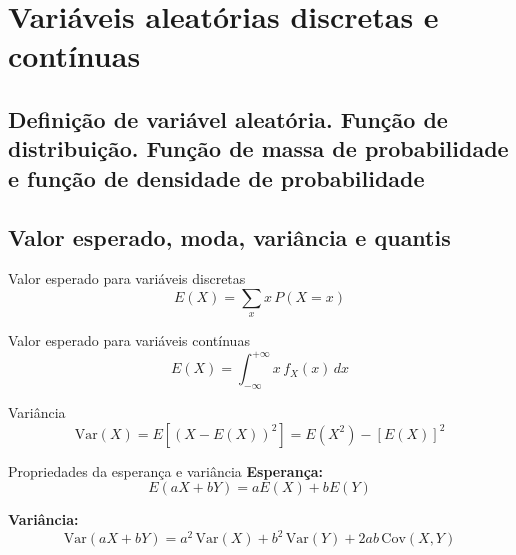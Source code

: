 \documentclass[a4paper,12pt]{article}
\begin{document}
\newpage

\section{\color{sectioncolor}Variáveis aleatórias discretas e contínuas}
\subsection{Definição de variável aleatória. Função de distribuição. Função de massa de probabilidade e função de densidade de probabilidade}

\subsection{Valor esperado, moda, variância e quantis}

\begin{formulabox}{Valor esperado para variáveis discretas}
\begin{equation}\label{formula6}\tag{Fórmula 6}
    E(X) = \sum_{x} x \, P(X = x)
\end{equation}
\end{formulabox}

\begin{formulabox}{Valor esperado para variáveis contínuas}
\begin{equation}\label{formula7}\tag{Fórmula 7}
    E(X) = \int_{-\infty}^{+\infty} x \, f_X(x) \, dx
\end{equation}
\end{formulabox}

\begin{formulabox}{Variância}
\begin{equation}\label{formula8}\tag{Fórmula 8}
    \mathrm{Var}(X) = E[(X - E(X))^2] = E(X^2) - [E(X)]^2
\end{equation}
\end{formulabox}

\begin{formulabox}{Propriedades da esperança e variância}
\textbf{Esperança:}
\begin{equation}\label{formula9}\tag{Fórmula 9}
    E(aX + bY) = aE(X) + bE(Y)
\end{equation}

\textbf{Variância:}
\begin{equation}\label{formula10}\tag{Fórmula 10}
    \mathrm{Var}(aX + bY) = a^2 \, \mathrm{Var}(X) + b^2 \, \mathrm{Var}(Y) + 2ab\,\mathrm{Cov}(X, Y)
\end{equation}
\end{formulabox}
\end{document}
